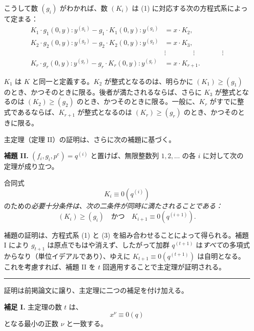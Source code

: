 こうして数 \((g_i)\) がわかれば、数 \((K_i)\) は (1) に対応する次の方程式系によって定まる：
\begin{equation}
\tag{3}
\begin{aligned}
K_1\cdot g_1(0,y):y^{(g_1)}-g_1\cdot K_1(0,y):y^{(g_1)}&=x\cdot K_2,\\
K_2\cdot g_2(0,y):y^{(g_2)}-g_2\cdot K_2(0,y):y^{(g_2)}&=x\cdot K_3,\\
&\vdots \qquad\qquad\vdots\qquad\qquad\vdots\\
K_r\cdot g_r(0,y):y^{(g_r)}-g_r\cdot K_r(0,y):y^{(g_r)}&=x\cdot K_{r+1}.
\end{aligned}
\end{equation}

\(K_1\) は \(K\) と同一と定義する。\(K_2\) が整式となるのは、明らかに \((K_1)\geq(g_1)\) のとき、かつそのときに限る。後者が満たされるならば、さらに \(K_3\) が整式となるのは \((K_2)\geq(g_2)\) のとき、かつそのときに限る。一般に、\(K_r\) がすでに整式であるならば、\(K_{r+1}\) が整式となるのは \((K_r)\geq(g_r)\) のとき、かつそのときに限る。

主定理（定理 II）の証明は、さらに次の補題に基づく。

\textbf{補題 II.} \((f_i,g_i,p^e)=q^{(i)}\) と置けば、無限整数列 \(1,2,\ldots\) の各 \(i\) に対して次の定理が成り立つ。

合同式
\[
K_i\equiv0(q^{(i)})
\]
のための\emph{必要十分条件は、次の二条件が同時に満たされることである：}
\[
(K_i)\geq(g_i)\quad\text{かつ}\quad K_{i+1}\equiv0(q^{(i+1)}).
\]

補題の証明は、方程式系 (1) と (3) を組み合わせることによって得られる。補題 I により \(g_{t+1}\) は原点でもはや消えず、したがって加群 \(q^{(t+1)}\) は\emph{すべて}の多項式からなり（単位イデアルであり）、ゆえに \(K_{t+1}\equiv0(q^{(t+1)})\) は自明となる。これを考慮すれば、補題 II を \(t\) 回適用することで主定理が証明される。

\begin{center}
\rule{4cm}{0.4pt}
\end{center}

証明は前掲論文に譲り、主定理に二つの補足を付け加える。

\textbf{補足 I.} 主定理の数 \(t\) は、
\[
x^\nu\equiv0(q)
\]
となる最小の正数 \(\nu\) と一致する。

